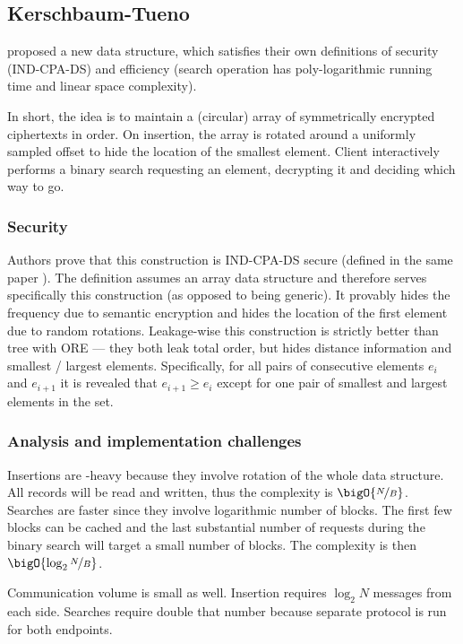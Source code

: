 \subsection{Kerschbaum-Tueno}

	\textcite{florian-protocol} proposed a new data structure, which satisfies their own definitions of security (IND-CPA-DS) and efficiency (search operation has poly\hyp{}logarithmic running time and linear space complexity).

	In short, the idea is to maintain a (circular) array of symmetrically encrypted ciphertexts in order.
	On insertion, the array is rotated around a uniformly sampled offset to hide the location of the smallest element.
	Client interactively performs a binary search requesting an element, decrypting it and deciding which way to go.

	\subsubsection{Security}
		Authors prove that this construction is IND-CPA-DS secure (defined in the same paper \cite{florian-protocol}).
		The definition assumes an array data structure and therefore serves specifically this construction (as opposed to being generic).
		It provably hides the frequency due to semantic encryption and hides the location of the first element due to random rotations.
		Leakage-wise this construction is strictly better than {\BPlus} tree with ORE --- they both leak total order, but \cite{florian-protocol} hides distance information and smallest / largest elements.
		Specifically, for all pairs of consecutive elements $e_i$ and $e_{i+1}$ it is revealed that $e_{i+1} \ge e_i$ except for one pair of smallest and largest elements in the set.

	\subsubsection{Analysis and implementation challenges}

		Insertions are {\IO}-heavy because they involve rotation of the whole data structure.
		All records will be read and written, thus the complexity is $\bigO{\nicefrac{N}{B}}$.
		Searches are faster since they involve logarithmic number of blocks.
		The first few blocks can be cached and the last substantial number of requests during the binary search will target a small number of blocks.
		The complexity is then $\bigO{\log_2 \nicefrac{N}{B}}$.

		Communication volume is small as well.
		Insertion requires $\log_2 N$ messages from each side.
		Searches require double that number because separate protocol is run for both endpoints.

